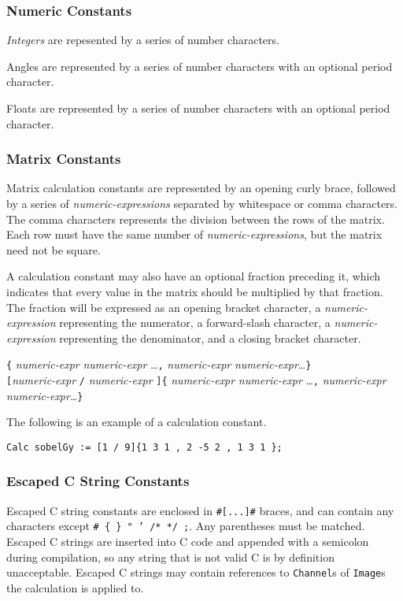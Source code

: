 \subsubsection{Numeric Constants}
\label{sssec:numericconstants}

\emph{Integers} are repesented by a series of number characters.

Angles are represented by a series of number characters with an
optional period character.

Floats are represented by a series of number characters with an
optional period character.

\subsubsection{Matrix Constants}
Matrix calculation constants are represented by an opening curly brace, followed
by a series of \emph{numeric-expressions} separated by whitespace or
comma characters. The comma  characters represents the division between
the rows of the matrix. Each row must have the same number of
\emph{numeric-expressions}, but the matrix need not be square.

A calculation constant may also have an optional fraction preceding it,
which indicates that every value in the matrix should be multiplied
by that fraction. The fraction will be expressed as an opening
bracket character, a \emph{numeric-expression} representing the
numerator, a forward-slash character, a \emph{numeric-expression}
representing the denominator, and a closing bracket character.

\startsyn
\texttt{\{} \emph{numeric-expr} \emph{numeric-expr} \ldots \texttt{,} \emph{numeric-expr} \emph{numeric-expr}\ldots \texttt{\}} \\
\texttt{[}\emph{numeric-expr} \texttt{/} \emph{numeric-expr} \texttt{]}\texttt{\{} \emph{numeric-expr} \emph{numeric-expr} \ldots \texttt{,} \emph{numeric-expr} \emph{numeric-expr}\ldots \texttt{\}}
\stopsyn

The following is an example of a calculation constant.
\begin{lstlisting}[language=CLAM,escapechar=\%]
Calc sobelGy := [1 / 9]{1 3 1 , 2 -5 2 , 1 3 1 };
\end{lstlisting}

\subsubsection{Escaped C String Constants}
Escaped C string constants are enclosed in \texttt{\#[...]\#} braces, and can contain any characters
except \texttt{\# \{ \} " ' /* */ ;}. Any parentheses must be matched.
Escaped C strings are inserted into C code and appended with a
semicolon during compilation, so any string that is not valid C is by definition unacceptable.
Escaped C strings may contain references to \texttt{Channel}s of \texttt{Image}s the calculation is applied to.


